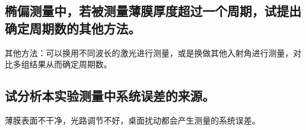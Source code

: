 \documentclass[a4paper]{article}
\begin{document}
\subsection{椭偏测量中，若被测量薄膜厚度超过一个周期，试提出确定周期数的其他方法。}
其他方法：可以换用不同波长的激光进行测量，或是换做其他入射角进行测量，对比多组结果从而确定周期数。

\subsection{试分析本实验测量中系统误差的来源。}
薄膜表面不干净，光路调节不好，桌面扰动都会产生测量的系统误差。

\nocite{jiaocai}

\end{document}

